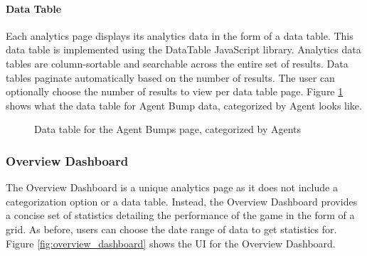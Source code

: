 \paragraph{Data Table}

Each analytics page displays its analytics data in the form of a data table. This data table is implemented using the DataTable JavaScript library. Analytics data tables are column-sortable and searchable across the entire set of results. Data tables paginate automatically based on the number of results. The user can optionally choose the number of results to view per data table page. Figure \ref{fig:data_table} shows what the data table for Agent Bump data, categorized by Agent looks like. 

\begin{figure}[htb]
	\caption[Analytics Site: Agent Bumps Data Table]{\label{fig:data_table} Data table for the Agent Bumps page, categorized by Agents}
\end{figure}

\subsubsection{Overview Dashboard}

The Overview Dashboard is a unique analytics page as it does not include a categorization option or a data table. Instead, the Overview Dashboard provides a concise set of statistics detailing the performance of the game in the form of a grid. As before, users can choose the date range of data to get statistics for. Figure \ref{fig:overview_dashboard} shows the UI for the Overview Dashboard.

